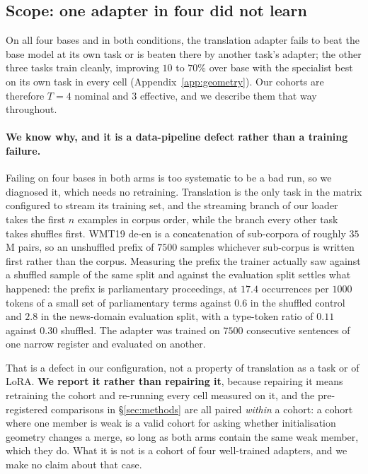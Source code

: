 \subsection{Scope: one adapter in four did not learn}
\label{subsec:scope}

On all four bases and in both conditions, the translation adapter fails to
beat the base model at its own task or is beaten there by another task's
adapter; the other three tasks train cleanly, improving $10$ to $70\%$ over
base with the specialist best on its own task in every cell
(Appendix~\ref{app:geometry}). Our cohorts are therefore $T=4$ nominal and
$3$ effective, and we describe them that way throughout.

\paragraph{We know why, and it is a data-pipeline defect rather than a
training failure.} Failing on four bases in both arms is too systematic to
be a bad run, so we diagnosed it, which needs no retraining. Translation is
the only task in the matrix configured to stream its training set, and the
streaming branch of our loader takes the first $n$ examples in corpus
order, while the branch every other task takes shuffles first. WMT19 de-en
is a concatenation of sub-corpora of roughly $35$M pairs, so an unshuffled
prefix of $7500$ samples whichever sub-corpus is written first rather than
the corpus. Measuring the prefix the trainer actually saw against a
shuffled sample of the same split and against the evaluation split settles
what happened: the prefix is parliamentary proceedings, at $17.4$
occurrences per $1000$ tokens of a small set of parliamentary terms against
$0.6$ in the shuffled control and $2.8$ in the news-domain evaluation
split, with a type-token ratio of $0.11$ against $0.30$ shuffled. The
adapter was trained on $7500$ consecutive sentences of one narrow register
and evaluated on another.

That is a defect in our configuration, not a property of translation as a
task or of LoRA. \textbf{We report it rather than repairing it}, because
repairing it means retraining the cohort and re-running every cell measured
on it, and the pre-registered comparisons in \S\ref{sec:methods} are all
paired \emph{within} a cohort: a cohort where one member is weak is a valid
cohort for asking whether initialisation geometry changes a merge, so long
as both arms contain the same weak member, which they do. What it is not is
a cohort of four well-trained adapters, and we make no claim about that
case.


